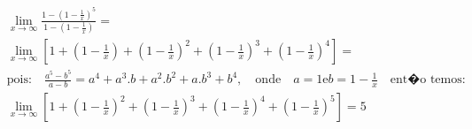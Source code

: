 \begin{ex}
\begin{align}
&\lim_{x\rightarrow \infty} \frac{1-\left(1-\frac{1}{x}\right)^5}{1-\left(1-\frac{1}{x}\right)}=\nonumber\\
&\lim_{x\rightarrow \infty} \left[1+\left(1-\frac{1}{x}\right)+\left(1-\frac{1}{x}\right)^2+\left(1-\frac{1}{x}\right)^3+\left(1-\frac{1}{x}\right)^4\right]=\nonumber\\
&\text {pois:} \quad \frac{a^5-b^5}{a-b}=a^4+a^3.b+a^2.b^2+a.b^3+b^4,\quad\text{onde}\quad a=1\text{e} b=1-\frac{1}{x} \quad \text {ent�o temos:}\nonumber\\
&\lim_{x\rightarrow \infty} \left[1+\left(1-\frac{1}{x}\right)^2+\left(1-\frac{1}{x}\right)^3+\left(1-\frac{1}{x}\right)^4+\left(1-\frac{1}{x}\right)^5\right]=5\nonumber
\end{align}
\end{ex}